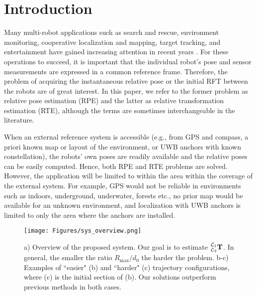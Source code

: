 \documentclass[journal]{IEEEtran}
\begin{document}
\section{Introduction} \label{sec:intro}

Many multi-robot applications such as search and rescue, environment monitoring, cooperative localization and mapping, target tracking, and entertainment have gained increasing attention in recent years \cite{queralta2020sarsurvey,shule2020mulituwbsurvey,rizk2019cooperative}. For these operations to succeed, it is important that the individual robot's pose and sensor measurements are expressed in a common reference frame. Therefore, the problem of acquiring the instantaneous relative pose or the initial RFT between the robots are of great interest. In this paper, we refer to the former problem as relative pose estimation (RPE) and the latter as relative transformation estimation (RTE), although the terms are sometimes interchangeable in the literature.

When an external reference system is accessible (e.g., from GPS and compass, a priori known map or layout of the environment, or UWB anchors with known constellation), the robots' own poses are readily available and the relative poses can be easily computed. Hence, both RPE and RTE problems are solved. However, the application will be limited to within the area within the coverage of the external system. For example, GPS would not be reliable in environments such as indoors, underground, underwater, forests etc., no prior map would be available for an unknown environment, and localization with UWB anchors is limited to only the area where the anchors are installed.

\begin{figure}[t]
\centering
	\texttt{[image: Figures/sys\_overview.png]}
    \caption{a) Overview of the proposed system. Our goal is to estimate $\prescript{\mathcal{L}_1}{\mathcal{L}_2}{\mathbf{T}}$. In general, the smaller the ratio $R_{\max}/d_0$ the harder the problem. b-c) Examples of “easier" (b) and “harder" (c) trajectory configurations, where (c) is the initial section of (b). Our solutions outperform previous methods in both cases.}
    \label{fig:sys_overview}
\end{figure}
\end{document}
